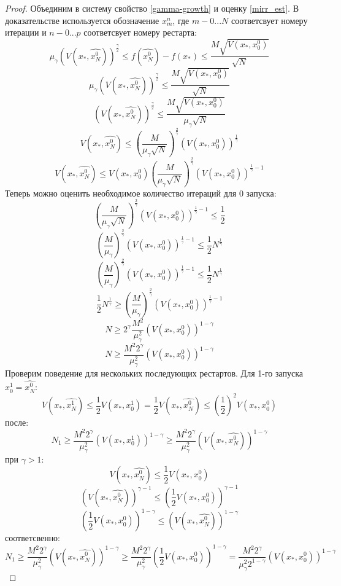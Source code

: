 \begin{proof}
   Объединим в систему свойство \ref{gamma-growth} и оценку \ref{mirr_est}. В доказательстве используется обозначение $x_m^n$, где $m - 0...N$ соответсвует номеру итерации и $n - 0...p$ соответсвует номеру рестарта: 
   $$
       \mu_{\gamma}(V(x_*, \widehat{x_N^0}))^{\frac{\gamma}{2}} \leq f(\widehat{x_N^0}) - f(x_*) \leq \frac{M\sqrt{V(x_*, x_0^0)}}{\sqrt{N}}
   $$
   $$
       \mu_{\gamma}(V(x_*, \widehat{x_N^0}))^{\frac{\gamma}{2}} \leq \frac{M\sqrt{V(x_*, x_0^0)}}{\sqrt{N}}
   $$
   $$
       (V(x_*, \widehat{x_N^0}))^{\frac{\gamma}{2}} \leq \frac{M\sqrt{V(x_*, x_0^0)}}{\mu_{\gamma}\sqrt{N}}
   $$
   $$
       V(x_*, \widehat{x_N^0}) \leq (\frac{M}{\mu_{\gamma}\sqrt{ N}})^{\frac{2}{\gamma}} (V(x_*, x_0^0))^{\frac{1}{\gamma}}
   $$
   $$
       V(x_*, \widehat{x_N^0}) \leq V(x_*, x_0^0) (\frac{M}{\mu_{\gamma}\sqrt{N}})^{\frac{2}{\gamma}} (V(x_*, x_0^0))^{\frac{1}{\gamma} - 1}
   $$
   Теперь можно оценить необходимое количество итераций для 0 запуска:
   $$
       (\frac{M}{\mu_{\gamma}\sqrt{N}})^{\frac{2}{\gamma}} (V(x_*, x_0^0))^{\frac{1}{\gamma} - 1} \leq \frac{1}{2} 
   $$
   $$
       (\frac{M}{\mu_{\gamma}})^{\frac{2}{\gamma}} (V(x_*, x_0^0))^{\frac{1}{\gamma} - 1} \leq \frac{1}{2} N^{\frac{1}{\gamma}} 
   $$
   $$
       (\frac{M}{\mu_{\gamma}})^{\frac{2}{\gamma}} (V(x_*, x_0^0))^{\frac{1}{\gamma} - 1} \leq \frac{1}{2} N^{\frac{1}{\gamma}} 
   $$
   $$
       \frac{1}{2} N^{\frac{1}{\gamma}} \geq (\frac{M}{\mu_{\gamma}})^{\frac{2}{\gamma}} (V(x_*, x_0^0))^{\frac{1}{\gamma} - 1}  
   $$
   $$
       N \geq 2 ^ {\gamma} \frac{M^2}{\mu_{\gamma}^2} (V(x_*, x_0^0))^{1 - \gamma}  
   $$
   $$
       N \geq \frac{M^2 2^{\gamma}}{\mu_{\gamma}^2} (V(x_*, x_0^0))^{1 - \gamma}  
   $$
   Проверим поведение для нескольких последующих рестартов. Для 1-го запуска $x_0^1 = \widehat{x_N^0}$:
   $$
       V(x_*, \widehat{x_N^1}) \leq \frac{1}{2} V(x_*, x_0^1) = \frac{1}{2} V(x_*, \widehat{x_N^0}) \leq (\frac{1}{2})^2 V(x_*, x_0^0) 
   $$
   после:
   $$
       N_1 \geq \frac{M^2 2^{\gamma}}{\mu_{\gamma}^2} (V(x_*, x_0^1))^{1 - \gamma} \geq \frac{M^2 2^{\gamma}}{\mu_{\gamma}^2} (V(x_*, \widehat{x_N^0}))^{1 - \gamma} 
   $$
   при $\gamma > 1$:
   $$
       V(x_*, \widehat{x_N^0}) \leq \frac{1}{2}V(x_*, x_0^0)  
   $$
   $$
       (V(x_*, \widehat{x_N^0}))^{\gamma - 1} \leq (\frac{1}{2} V(x_*, x_0^0))^{\gamma - 1}
   $$
   $$
        (\frac{1}{2} V(x_*, x_0^0))^{1 - \gamma} \leq (V(x_*, \widehat{x_N^0}))^{1 - \gamma}
   $$
   соответсвенно:
   $$
       N_1 \geq \frac{M^2 2^{\gamma}}{\mu_{\gamma}^2} (V(x_*, \widehat{x_N^0}))^{1 - \gamma} \geq \frac{M^2 2^{\gamma}}{\mu_{\gamma}^2} (\frac{1}{2} V(x_*, x_0^0))^{1 - \gamma} = \frac{M^2 2^{\gamma}}{\mu_{\gamma}^2 2^{1-\gamma}} (V(x_*, x_0^0))^{1 - \gamma}
$$
\end{proof}
